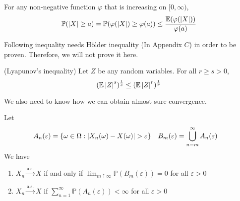 \documentclass{huhtakm-template-book}
\newcommand{\prob}{\mathbb{P}}
\newcommand{\expect}{\mathbb{E}}
\begin{document}
\begin{rem}
	For any non-negative function $\varphi$ that is increasing on $[0,\infty)$,
	\begin{equation*}
		\prob(\abs{X}\geq a)=\prob(\varphi(\abs{X})\geq\varphi(a))\leq\frac{\expect(\varphi(\abs{X}))}{\varphi(a)}
	\end{equation*}
\end{rem}
Following inequality needs H\"older inequality (In Appendix $C$) in order to be proven. Therefore, we will not prove it here.
\begin{lem}(Lyapunov's inequality)
	Let $Z$ be any random variables. For all $r\geq s>0$,
	\begin{equation*}
		(\expect\abs{Z}^{s})^{\frac{1}{s}}\leq(\expect\abs{Z}^{r})^{\frac{1}{r}}
	\end{equation*}
\end{lem}
We also need to know how we can obtain almost sure convergence.
\begin{lem}
	\label{Chapter 7 Lemma Obtaining almost sure convergence}
	Let
	\begin{align*}
		A_{n}(\varepsilon)&=\{\omega\in\Omega:\abs{X_{n}(\omega)-X(\omega)}>\varepsilon\} & B_{m}(\varepsilon)&=\bigcup_{n=m}^{\infty}A_{n}(\varepsilon)
	\end{align*}
	We have
	\begin{enumerate}
		\item $X_{n}\xrightarrow{\text{a.s.}}X$ if and only if $\lim_{m\uparrow\infty}\prob(B_{m}(\varepsilon))=0$ for all $\varepsilon>0$
		\item $X_{n}\xrightarrow{\text{a.s.}}X$ if $\sum_{n=1}^{\infty}\prob(A_{n}(\varepsilon))<\infty$ for all $\varepsilon>0$
	\end{enumerate}
\end{lem}
\end{document}
